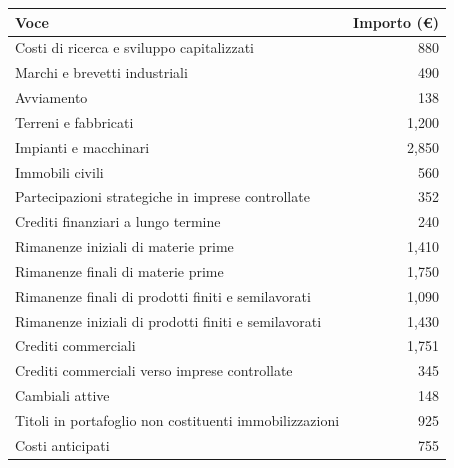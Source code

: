 \documentclass{article}
\begin{document}
\newpage
\setlength{\extrarowheight}{0.5pt} %
\centering
\begin{longtable}{|l|r|}
    \hline
    \textbf{Voce}                                          & \textbf{Importo (€)} \\
    \hline
    Costi di ricerca e sviluppo capitalizzati              & 880                  \\
    \hline
    Marchi e brevetti industriali                          & 490                  \\
    \hline
    Avviamento                                             & 138                  \\
    \hline
    Terreni e fabbricati                                   & 1,200                \\
    \hline
    Impianti e macchinari                                  & 2,850                \\
    \hline
    Immobili civili                                        & 560                  \\
    \hline
    Partecipazioni strategiche in imprese controllate      & 352                  \\
    \hline
    Crediti finanziari a lungo termine                     & 240                  \\
    \hline
    Rimanenze iniziali di materie prime                    & 1,410                \\
    \hline
    Rimanenze finali di materie prime                      & 1,750                \\
    \hline
    Rimanenze finali di prodotti finiti e semilavorati     & 1,090                \\
    \hline
    Rimanenze iniziali di prodotti finiti e semilavorati   & 1,430                \\
    \hline
    Crediti commerciali                                    & 1,751                \\
    \hline
    Crediti commerciali verso imprese controllate          & 345                  \\
    \hline
    Cambiali attive                                        & 148                  \\
    \hline
    Titoli in portafoglio non costituenti immobilizzazioni & 925                  \\
    \hline
    Costi anticipati                                       & 755                  \\
    \hline

\end{longtable}
\end{document}
